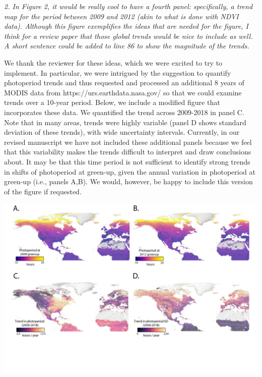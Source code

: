 \documentclass{article}
\begin{document}
\par \emph{2. In Figure 2, it would be really cool to have a fourth panel: specifically, a trend map for the period between 2009 and 2012 (akin to what is done with NDVI data). Although this figure exemplifies the ideas that are needed for the figure, I think for a review paper that those global trends would be nice to include as well. A short sentence could be added to line 86 to show the magnitude of the trends. }
\par We thank the reviewer for these ideas, which we were excited to try to implement. In particular,  we were intrigued by the suggestion to quantify photoperiod trends and thus requested and processed an additional 8 years of MODIS data from https://urs.earthdata.nasa.gov/ so that we could examine trends over a 10-year period. Below, we include a modified figure that incorporates these data. We quantified the trend across 2009-2018 in panel C. Note that in many areas, trends were highly variable (panel D shows standard deviation of these trends), with wide uncertainty intervals. Currently, in our revised manuscript we have not included these additional panels because we feel that this variability makes the trends difficult to interpret and draw conclusions about.  It may be that this time period is not sufficient to identify strong trends in shifts of photoperiod at green-up, given the annual variation in photoperiod at green-up (i.e., panels A,B). We would, however, be happy to include this version of the figure if requested.
\par
\includegraphics{../figures/Greenup_corr_sm_leg_4panels_sds.pdf} %
\end{document}
